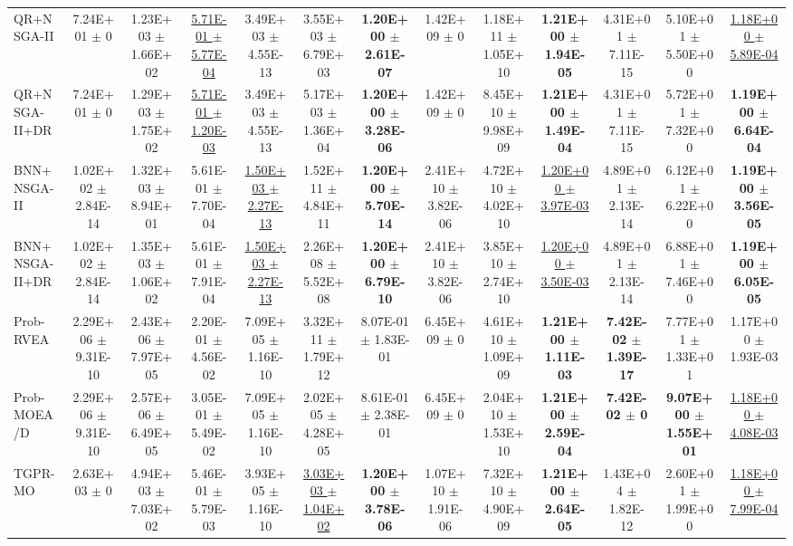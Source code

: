 \documentclass[conference]{IEEEtran}
\begin{document}
\begin{table}[htbp]
{\begin{tabular}{lcccccccccccc}
QR+NSGA-II & 7.24E+01 $\pm$ 0 & 1.23E+03 $\pm$ 1.66E+02 & \underline{5.71E-01 $\pm$ 5.77E-04} & 3.49E+03 $\pm$ 4.55E-13 & 3.55E+03 $\pm$ 6.79E+03 & \textbf{1.20E+00 $\pm$ 2.61E-07} & 1.42E+09 $\pm$ 0 & 1.18E+11 $\pm$ 1.05E+10 & \textbf{1.21E+00 $\pm$ 1.94E-05} & 4.31E+01 $\pm$ 7.11E-15 & 5.10E+01 $\pm$ 5.50E+00 & \underline{1.18E+00 $\pm$ 5.89E-04} \\
QR+NSGA-II+DR & 7.24E+01 $\pm$ 0 & 1.29E+03 $\pm$ 1.75E+02 & \underline{5.71E-01 $\pm$ 1.20E-03} & 3.49E+03 $\pm$ 4.55E-13 & 5.17E+03 $\pm$ 1.36E+04 & \textbf{1.20E+00 $\pm$ 3.28E-06} & 1.42E+09 $\pm$ 0 & 8.45E+10 $\pm$ 9.98E+09 & \textbf{1.21E+00 $\pm$ 1.49E-04} & 4.31E+01 $\pm$ 7.11E-15 & 5.72E+01 $\pm$ 7.32E+00 & \textbf{1.19E+00 $\pm$ 6.64E-04} \\
BNN+NSGA-II & 1.02E+02 $\pm$ 2.84E-14 & 1.32E+03 $\pm$ 8.94E+01 & 5.61E-01 $\pm$ 7.70E-04 & \underline{1.50E+03 $\pm$ 2.27E-13} & 1.52E+11 $\pm$ 4.84E+11 & \textbf{1.20E+00 $\pm$ 5.70E-14} & 2.41E+10 $\pm$ 3.82E-06 & 4.72E+10 $\pm$ 4.02E+10 & \underline{1.20E+00 $\pm$ 3.97E-03} & 4.89E+01 $\pm$ 2.13E-14 & 6.12E+01 $\pm$ 6.22E+00 & \textbf{1.19E+00 $\pm$ 3.56E-05} \\
BNN+NSGA-II+DR & 1.02E+02 $\pm$ 2.84E-14 & 1.35E+03 $\pm$ 1.06E+02 & 5.61E-01 $\pm$ 7.91E-04 & \underline{1.50E+03 $\pm$ 2.27E-13} & 2.26E+08 $\pm$ 5.52E+08 & \textbf{1.20E+00 $\pm$ 6.79E-10} & 2.41E+10 $\pm$ 3.82E-06 & 3.85E+10 $\pm$ 2.74E+10 & \underline{1.20E+00 $\pm$ 3.50E-03} & 4.89E+01 $\pm$ 2.13E-14 & 6.88E+01 $\pm$ 7.46E+00 & \textbf{1.19E+00 $\pm$ 6.05E-05} \\
Prob-RVEA & 2.29E+06 $\pm$ 9.31E-10 & 2.43E+06 $\pm$ 7.97E+05 & 2.20E-01 $\pm$ 4.56E-02 & 7.09E+05 $\pm$ 1.16E-10 & 3.32E+11 $\pm$ 1.79E+12 & 8.07E-01 $\pm$ 1.83E-01 & 6.45E+09 $\pm$ 0 & 4.61E+10 $\pm$ 1.09E+09 & \textbf{1.21E+00 $\pm$ 1.11E-03} & \textbf{7.42E-02 $\pm$ 1.39E-17} & 7.77E+01 $\pm$ 1.33E+01 & 1.17E+00 $\pm$ 1.93E-03 \\
Prob-MOEA/D & 2.29E+06 $\pm$ 9.31E-10 & 2.57E+06 $\pm$ 6.49E+05 & 3.05E-01 $\pm$ 5.49E-02 & 7.09E+05 $\pm$ 1.16E-10 & 2.02E+05 $\pm$ 4.28E+05 & 8.61E-01 $\pm$ 2.38E-01 & 6.45E+09 $\pm$ 0 & 2.04E+10 $\pm$ 1.53E+10 & \textbf{1.21E+00 $\pm$ 2.59E-04} & \textbf{7.42E-02 $\pm$ 0} & \textbf{9.07E+00 $\pm$ 1.55E+01} & \underline{1.18E+00 $\pm$ 4.08E-03} \\
TGPR-MO & 2.63E+03 $\pm$ 0 & 4.94E+03 $\pm$ 7.03E+02 & 5.46E-01 $\pm$ 5.79E-03 & 3.93E+05 $\pm$ 1.16E-10 & \underline{3.03E+03 $\pm$ 1.04E+02} & \textbf{1.20E+00 $\pm$ 3.78E-06} & 1.07E+10 $\pm$ 1.91E-06 & 7.32E+10 $\pm$ 4.90E+09 & \textbf{1.21E+00 $\pm$ 2.64E-05} & 1.43E+04 $\pm$ 1.82E-12 & 2.60E+01 $\pm$ 1.99E+00 & \underline{1.18E+00 $\pm$ 7.99E-04} \\

\end{tabular}}
\end{table}
\end{document}
